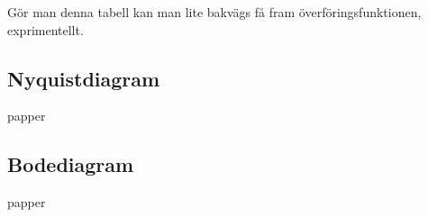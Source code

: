\documentclass[12pt]{article} %
\begin{document}
Gör man denna tabell kan man lite bakvägs få fram överföringsfunktionen, exprimentellt.

\subsection{Nyquistdiagram}

papper

\subsection{Bodediagram}

papper

\end{document}
